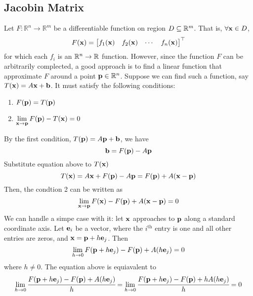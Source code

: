     \subsection{Jacobin Matrix}
    Let $F:\mathbb{R}^n\to \mathbb{R}^m$ be a differentiable function on region $D\subseteq \mathbb{R}^m$. That is, $\forall \mathbf{x}\in D$, 
    \begin{equation*}
        F(\mathbf{x}) = \begin{bmatrix}
            f_1(\mathbf{x}) & f_2(\mathbf{x}) & \cdots & f_n(\mathbf{x})
        \end{bmatrix}^\top
    \end{equation*}
    for which each $f_i$ is an $\mathbb{R}^n \to \mathbb{R}$ function. However, since the function $F$ can be arbitrarily complected, a good approach is to find a linear function that approximate $F$ around a point $\mathbf{p}\in \mathbb{R}^n$. Suppose we can find such a function, say $T(\mathbf{x}) = A\mathbf{x} + \mathbf{b}$. It must satisfy the following conditions:
    \begin{enumerate}
        \item $F(\mathbf{p}) = T(\mathbf{p})$
        \item $\displaystyle \lim_{\mathbf{x}\to \mathbf{p}}F(\mathbf{p}) - T({\mathbf{x}}) = 0 $
    \end{enumerate}
    By the first condition, $T(\mathbf{p}) = A\mathbf{p} + \mathbf{b}$, we have
    \begin{equation}
        \mathbf{b} = F(\mathbf{p}) - A\mathbf{p}
    \end{equation}
    Substitute equation above to $T(\mathbf{x})$
    \begin{equation}
        T(\mathbf{x}) = A\mathbf{x} + F(\mathbf{p}) - A\mathbf{p} = F(\mathbf{p}) + A(\mathbf{x} - \mathbf{p})
    \end{equation}
    Then, the condtion 2 can be written as
    \begin{equation}
        \lim_{\mathbf{x}\to \mathbf{p}} F(\mathbf{x}) - F(\mathbf{p}) + A(\mathbf{x} - \mathbf{p}) = 0
    \end{equation}
    We can handle a simpe case with it: let $\mathbf{x}$ approaches to $\mathbf{p}$ along a standard coordinate axis. Let $\mathbf{e}_i$ be a vector, where the $i^{\text{th}}$ entry is one and all other entries are zeros, and $\mathbf{x} = \mathbf{p} + h\mathbf{e}_j$. Then
    \begin{equation}
        \lim_{h\to 0} F(\mathbf{p} + h\mathbf{e}_j) - F(\mathbf{p}) + A(h\mathbf{e}_j) = 0
    \end{equation} where $h\neq 0$. The equation above is equiavalent to
    \begin{equation}
        \lim_{h\to 0} \cfrac{F(\mathbf{p} + h\mathbf{e}_j) - F(\mathbf{p}) + A(h\mathbf{e}_j)}{h} = \lim_{h\to 0} \cfrac{F(\mathbf{p} + h\mathbf{e}_j) - F(\mathbf{p}) + hA(h\mathbf{e}_j)}{h} = 0
    \end{equation}
